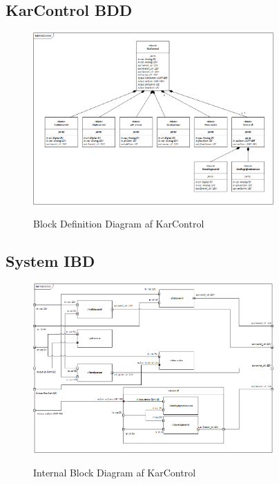 
\subsection{KarControl BDD}

\begin{figure}[H]
	\centering
	\includegraphics[width=0.82\textwidth]{Systemarkitektur/KarControl/KarControl_BDD.png}
	\label{fig:KarControl BDD}
	\caption{Block Definition Diagram af KarControl}
\end{figure}



\subsection{System IBD}

\begin{figure}[H]
	\centering
	\includegraphics[width=0.82\textwidth]{Systemarkitektur/KarControl/KarControl_IBD.png}
	\label{fig:KarControl IBD}
	\caption{Internal Block Diagram af KarControl}
\end{figure}



